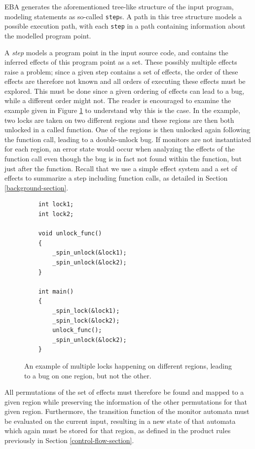 \newpar EBA generates the aforementioned tree-like structure of the input program, modeling statements as so-called \texttt{step}s. A path in this tree structure models a possible execution path, with each \texttt{step} in a path containing information about the modelled program point. 

\newpar A \textit{step} models a program point in the input source code, and contains the inferred effects of this program point as a set. These possibly multiple effects raise a problem; since a given step contains a set of effects, the order of these effects are therefore not known and all orders of executing these effects must be explored. This must be done since a given ordering of effects can lead to a bug, while a different order might not. The reader is encouraged to examine the example given in Figure \ref{multiple-region-example} to understand why this is the case. In the example, two locks are taken on two different regions and these regions are then both unlocked in a called function. One of the regions is then unlocked again following the function call, leading to a double-unlock bug. If monitors are not instantiated for each region, an error state would occur when analyzing the effects of the function call even though the bug is in fact not found within the function, but just after the function. Recall that we use a simple effect system and a set of effects to summarize a step including function calls, as detailed in Section \ref{background-section}.

\begin{figure}[H]
    \centering
    \begin{verbatim}
    int lock1;
    int lock2;

    void unlock_func()
    {
        _spin_unlock(&lock1);
        _spin_unlock(&lock2);
    }

    int main()
    {
        _spin_lock(&lock1);
        _spin_lock(&lock2);
        unlock_func();
        _spin_unlock(&lock2);
    }
    \end{verbatim}
    \caption{An example of multiple locks happening on different regions, leading to a bug on one region, but not the other.}
    \label{multiple-region-example}
\end{figure}

\noindent All permutations of the set of effects must therefore be found and mapped to a given region while preserving the information of the other permutations for that given region. Furthermore, the transition function of the monitor automata must be evaluated on the current input, resulting in a new state of that automata which again must be stored for that region, as defined in the product rules previously in Section \ref{control-flow-section}.

